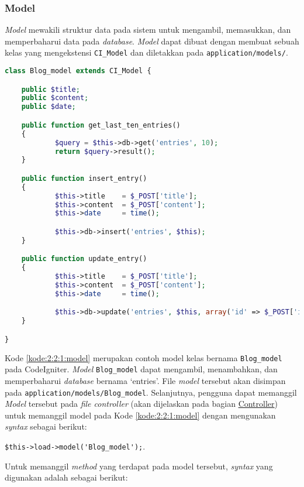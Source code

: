 \subsubsection{Model}
\label{sub:2:2:1:model}

\textit{Model} mewakili struktur data pada sistem untuk mengambil, memasukkan, dan memperbaharui data pada \textit{database}. \textit{Model} dapat dibuat dengan membuat sebuah kelas yang mengekstensi \verb|CI_Model| dan diletakkan pada \verb|application/models/|.

\begin{lstlisting}[language=php, caption=Contoh \textit{model}, label=kode:2:2:1:model]
class Blog_model extends CI_Model {

	public $title;
	public $content;
	public $date;

	public function get_last_ten_entries()
	{
			$query = $this->db->get('entries', 10);
			return $query->result();
	}

	public function insert_entry()
	{
			$this->title    = $_POST['title'];
			$this->content  = $_POST['content'];
			$this->date     = time();

			$this->db->insert('entries', $this);
	}

	public function update_entry()
	{
			$this->title    = $_POST['title'];
			$this->content  = $_POST['content'];
			$this->date     = time();

			$this->db->update('entries', $this, array('id' => $_POST['id']));
	}

}
\end{lstlisting}

Kode \ref{kode:2:2:1:model} merupakan contoh model kelas bernama \verb|Blog_model| pada CodeIgniter. \textit{Model} \verb|Blog_model| dapat mengambil, menambahkan, dan memperbaharui \textit{database} bernama `entries'. File \textit{model} tersebut akan disimpan pada \verb|application/models/Blog_model|. Selanjutnya, pengguna dapat memanggil \textit{Model} tersebut pada \textit{file controller} (akan dijelaskan pada bagian \hyperref[sub:2:2:3:Controller]{Controller}) untuk memanggil model pada Kode \ref{kode:2:2:1:model} dengan mengunakan \textit{syntax} sebagai berikut:

\begin{center}
	\verb|$this->load->model('Blog_model');|.
\end{center}

Untuk memanggil \textit{method} yang terdapat pada model tersebut, \textit{syntax} yang digunakan adalah sebagai berikut:

